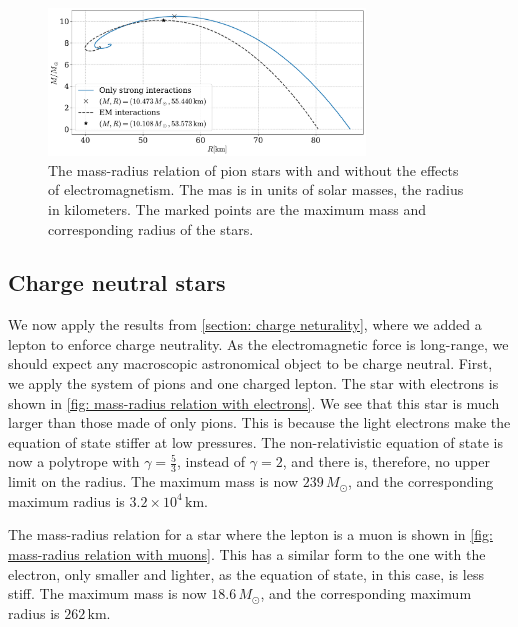 \begin{figure}[H]
    \centering
    \includegraphics[width=0.75\textwidth]{../scripts/figurer/pion_star/mass_radius_pion_star_compare.pdf}
    \caption{
        The mass-radius relation of pion stars with and without the effects of electromagnetism.
        The mas is in units of solar masses, the radius in kilometers.
        The marked points are the maximum mass and corresponding radius of the stars.
        }
        \label{fig: mass-radius relation comparison}
\end{figure} 




\subsection{Charge neutral stars}


We now apply the results from \autoref{section: charge neturality}, where we added a lepton to enforce charge neutrality.
As the electromagnetic force is long-range, we should expect any macroscopic astronomical object to be charge neutral.
First, we apply the system of pions and one charged lepton.
The star with electrons is shown in \autoref{fig: mass-radius relation with electrons}.
We see that this star is much larger than those made of only pions.
This is because the light electrons make the equation of state stiffer at low pressures.
The non-relativistic equation of state is now a polytrope with $\gamma = \frac{5}{3}$, instead of $\gamma = 2$, and there is, therefore, no upper limit on the radius.
The maximum mass is now $239\, M_\odot $, and the corresponding maximum radius is $ 3.2\times10^4\,\text{km}$.

The mass-radius relation for a star where the lepton is a muon is shown in \autoref{fig: mass-radius relation with muons}.
This has a similar form to the one with the electron, only smaller and lighter, as the equation of state, in this case, is less stiff.
The maximum mass is now $18.6\, M_\odot $, and the corresponding maximum radius is $ 262 \,\text{km}$.

